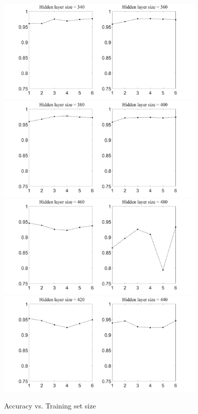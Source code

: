 \documentclass[conference]{IEEEtran}
\begin{document}
\begin{subfigures}
\begin{figure}[tmbh]
\centering
\includegraphics[width=10cm]{AccuracyTSSizeI.pdf}
\includegraphics[width=10cm]{AccuracyTSSizeJ.pdf}
\includegraphics[width=10cm]{AccuracyTSSizeL.pdf}
\includegraphics[width=10cm]{AccuracyTSSizeK.pdf}
\caption{Accuracy vs. Training set size}
\label{figure:ATSS_C}
\end{figure}
\end{subfigures}
\end{document}
